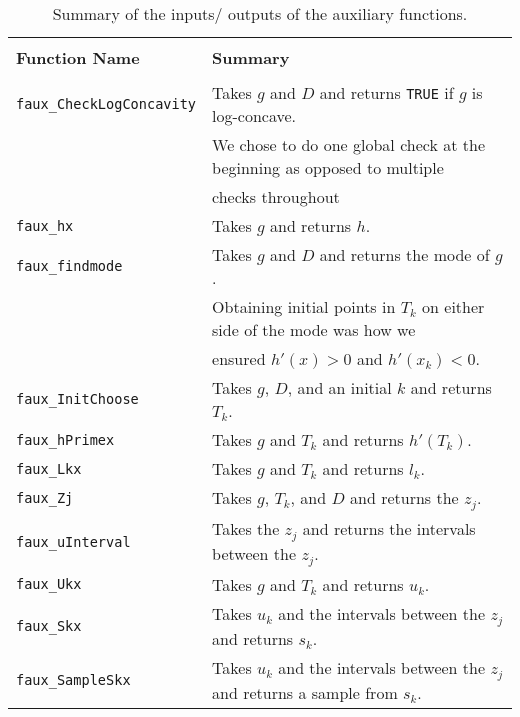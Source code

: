 \documentclass{article}\usepackage[]{graphicx}\usepackage[]{color}
\begin{document}
\begin{table}[]
\centering
\caption{Summary of the inputs/ outputs of the auxiliary functions.}
\label{}
\begin{tabular}{ll}
\hline \\
\textbf{Function Name} & \textbf{Summary}                                                                 \\
\hline \\
\texttt{faux\_CheckLogConcavity} & Takes $g$ and $D$ and returns \texttt{TRUE} if $g$ is log-concave.              \\
                                 & We chose to do one global check at the beginning as opposed to multiple         \\
																 & checks throughout                                                                \\
\texttt{faux\_hx}                & Takes $g$ and returns $h$.                                                       \\
\texttt{faux\_findmode}          & Takes $g$ and $D$ and returns the mode of $g$.                                   \\
                                 & Obtaining initial points in $T_k$ on either side of the mode was how we          \\
																 & ensured $h'(x) > 0$ and $h'(x_k) < 0$.                                           \\
\texttt{faux\_InitChoose}        & Takes $g$, $D$, and an initial $k$ and returns $T_k$.                            \\
\texttt{faux\_hPrimex}           & Takes $g$ and $T_k$ and returns $h'(T_k)$.                                       \\
\texttt{faux\_Lkx}               & Takes $g$ and $T_k$ and returns $l_k$.                                           \\
\texttt{faux\_Zj}                & Takes $g$, $T_k$, and $D$ and returns the $z_j$.                                 \\
\texttt{faux\_uInterval}         & Takes the $z_j$ and returns the intervals between the $z_j$.                     \\
\texttt{faux\_Ukx}               & Takes $g$ and $T_k$ and returns $u_k$.                                           \\
\texttt{faux\_Skx}               & Takes $u_k$ and the intervals between the $z_j$ and returns $s_k$.               \\
\texttt{faux\_SampleSkx}         & Takes $u_k$ and the intervals between the $z_j$ and returns a sample from $s_k$. \\
\hline
\end{tabular}
\end{table}
\end{document}
